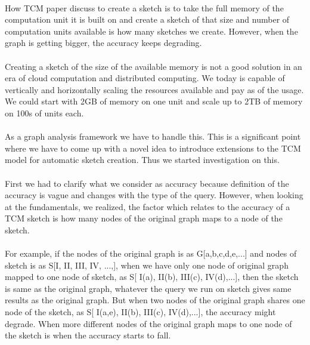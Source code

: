 \documentclass[12pt]{report}
\numberwithin{figure}{section}
\numberwithin{table}{section}
\begin{document}
\paragraph{}

How TCM paper discuss to create a sketch is to take the full memory of the computation unit it is built on and create a sketch of that size and number of computation units available is how many sketches we create. However, when the graph is getting bigger, the accuracy keeps degrading. 

\paragraph{}

Creating a sketch of the size of the available memory is not a good solution in an era of cloud computation and distributed computing. We today is capable of vertically and horizontally scaling the resources available and pay as of the usage. We could start with 2GB of memory on one unit and scale up to 2TB of memory on 100s of units each.

\paragraph{}

As a graph analysis framework we have to handle this. This is a significant point where we have to come up with a novel idea to introduce extensions to the TCM model for automatic sketch creation. Thus we started investigation on this.

\paragraph{}

First we had to clarify what we consider as accuracy because definition of the accuracy is vague and changes with the type of the query. However, when looking at the fundamentals, we realized, the factor which relates to the accuracy of a TCM sketch is how many nodes of the original graph maps to a node of the sketch.

\paragraph{}

 For example, if the nodes of the original graph is as G[a,b,c,d,e,...] and nodes of sketch is as S[I, II, III, IV, ...,], when  we have only one node of original graph mapped to one node of sketch, as S[ I(a), II(b), III(c), IV(d),...], then the sketch is same as the original graph, whatever the query we run on sketch gives same results as the original graph. But when two nodes of the original graph shares one node of the sketch, as S[ I(a,e), II(b), III(c), IV(d),...], the accuracy might degrade. When more different nodes of the original graph maps to one node of the sketch is when the accuracy starts to fall. 
\end{document}
